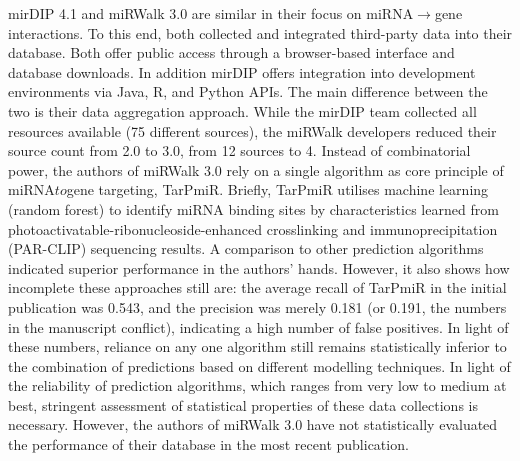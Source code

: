 mirDIP 4.1\cite{Tokar2018} and miRWalk 3.0\cite{Sticht2018} are similar in their focus on miRNA$\to$gene interactions. To this end, both collected and integrated third-party data into their database. Both offer public access through a browser-based interface and database downloads. In addition mirDIP offers integration into development environments via Java, R, and Python APIs. The main difference between the two is their data aggregation approach. While the mirDIP team collected all resources available (75 different sources\cite{Tokar2018}), the miRWalk developers reduced their source count from 2.0 to 3.0, from 12 sources to 4.\cite{Sticht2018} Instead of combinatorial power, the authors of miRWalk 3.0 rely on a single algorithm as core principle of miRNA$to$gene targeting, TarPmiR.\cite{Ding2016} Briefly, TarPmiR utilises machine learning (random forest) to identify miRNA binding sites by characteristics learned from photoactivatable-ribonucleoside-enhanced crosslinking and immunoprecipitation (PAR-CLIP) sequencing results. A comparison to other prediction algorithms indicated superior performance in the authors' hands.\cite{Ding2016} However, it also shows how incomplete these approaches still are: the average recall of TarPmiR in the initial publication was 0.543, and the precision was merely 0.181 (or 0.191, the numbers in the manuscript conflict), indicating a high number of false positives. In light of these numbers, reliance on any one algorithm still remains statistically inferior to the combination of predictions based on different modelling techniques.\cite{Witkos2011} In light of the reliability of prediction algorithms, which ranges from very low to medium at best, stringent assessment of statistical properties of these data collections is necessary. 
However, the authors of miRWalk 3.0 have not statistically evaluated the performance of their database in the most recent publication.\cite{Sticht2018}


